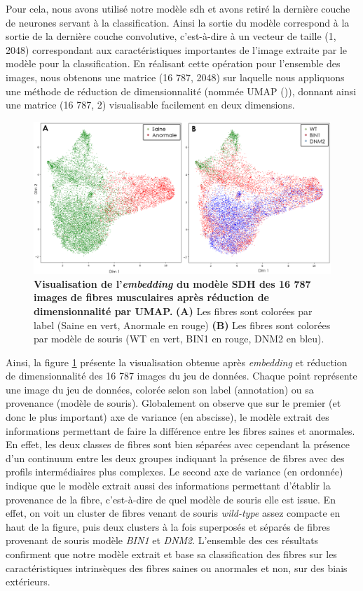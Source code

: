 Pour cela, nous avons utilisé notre modèle \gls{sdh} et avons retiré la dernière couche de neurones servant à la classification. Ainsi la sortie du modèle correspond à la sortie de la dernière couche convolutive, c'est-à-dire à un vecteur de taille (1, 2048) correspondant aux caractéristiques importantes de l'image extraite par le modèle pour la classification. En réalisant cette opération pour l'ensemble des images, nous obtenons une matrice (16 787, 2048) sur laquelle nous appliquons une méthode de réduction de dimensionnalité (nommée UMAP (\cite{mcinnes_umap_2020})), donnant ainsi une matrice (16 787, 2) visualisable facilement en deux dimensions.
\begin{figure}[!htbp]
 \centering
 \includegraphics[width=1\textwidth]{figures/umap_sdh.png}
 \caption[Visualisation de l'\textit{embedding} du modèle SDH]{\textbf{Visualisation de l'\textit{embedding} du modèle SDH des 16 787 images de fibres musculaires après réduction de dimensionnalité par UMAP.} \textbf{(A)} Les fibres sont colorées par label (Saine en vert, Anormale en rouge) \textbf{(B)} Les fibres sont colorées par modèle de souris (WT en vert, BIN1 en rouge, DNM2 en bleu).}
 \label{fig:umap_sdh}
\end{figure}

Ainsi, la figure \ref{fig:umap_sdh} présente la visualisation obtenue après \textit{embedding} et réduction de dimensionnalité des 16 787 images du jeu de données. Chaque point représente une image du jeu de données, colorée selon son label (annotation) ou sa provenance (modèle de souris). Globalement on observe que sur le premier (et donc le plus important) axe de variance (en abscisse), le modèle extrait des informations permettant de faire la différence entre les fibres saines et anormales. En effet, les deux classes de fibres sont bien séparées avec cependant la présence d'un continuum entre les deux groupes indiquant la présence de fibres avec des profils intermédiaires plus complexes. Le second axe de variance (en ordonnée) indique que le modèle extrait aussi des informations permettant d'établir la provenance de la fibre, c'est-à-dire de quel modèle de souris elle est issue. En effet, on voit un cluster de fibres venant de souris \textit{wild-type} assez compacte en haut de la figure, puis deux clusters à la fois superposés et séparés de fibres provenant de souris modèle \textit{BIN1} et \textit{DNM2}. L'ensemble des ces résultats confirment que notre modèle extrait et base sa classification des fibres sur les caractéristiques intrinsèques des fibres saines ou anormales et non, sur des biais extérieurs.

